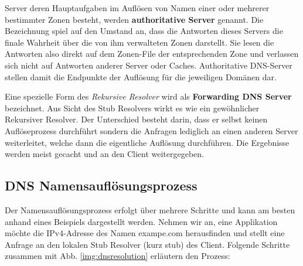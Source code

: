 Server deren Hauptaufgaben im Auflösen von Namen einer oder mehrerer bestimmter Zonen besteht, werden \textbf{authoritative Server} genannt. Die Bezeichnung spiel auf den Umstand an, dass die Antworten dieses Servers die finale Wahrheit über die von ihm verwalteten Zonen darstellt. Sie lesen die Antworten also direkt auf dem Zonen-File der entsprechenden Zone und verlassen sich nicht auf Antworten anderer Server oder Caches. Authoritative DNS-Server stellen damit die Endpunkte der Auflösung für die jeweiligen Domänen dar.

Eine spezielle Form des \textit{Rekursive Resolver} wird als \textbf{Forwarding DNS Server} bezeichnet. Aus Sicht des Stub Resolvers wirkt es wie ein gewöhnlicher Rekursiver Resolver. Der Unterschied besteht darin, dass er selbst keinen Auflöseprozess durchführt sondern die Anfragen lediglich an einen anderen Server weiterleitet, welche dann die eigentliche Auflösung durchführen. Die Ergebnisse werden meist gecacht und an den Client weitergegeben. 

\subsection{DNS Namensauflösungsprozess}
\label{subsec:dnsresolution}

Der Namensauflösungsprozess erfolgt über mehrere Schritte und kann am besten anhand eines Beispiels dargestellt werden. Nehmen wir an, eine Applikation möchte die IPv4-Adresse des Namen exampe.com herausfinden und stellt eine Anfrage an den lokalen Stub Resolver (kurz stub) des Client. Folgende Schritte zusammen mit Abb. \ref{img:dnsresolution} erläutern den Prozess: 

